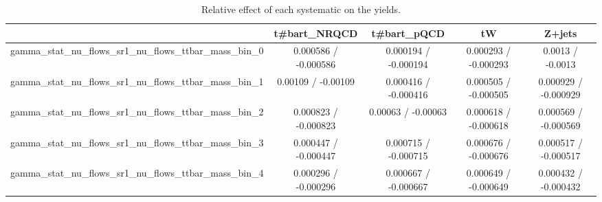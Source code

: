 \documentclass[10pt]{article}
\begin{document}
\begin{table}[htbp]
\begin{center}
\begin{tabular}{|c|c|c|c|c|}
\hline 
      & t#bar{t}_{NRQCD}      & t#bar{t}_{pQCD}      & tW      & Z+jets \\ 
\hline 
  gamma_stat_nu_flows_sr1_nu_flows_ttbar_mass_bin_0 & 0.000586 / -0.000586 & 0.000194 / -0.000194 & 0.000293 / -0.000293 & 0.0013 / -0.0013 \\ 
  gamma_stat_nu_flows_sr1_nu_flows_ttbar_mass_bin_1 & 0.00109 / -0.00109 & 0.000416 / -0.000416 & 0.000505 / -0.000505 & 0.000929 / -0.000929 \\ 
  gamma_stat_nu_flows_sr1_nu_flows_ttbar_mass_bin_2 & 0.000823 / -0.000823 & 0.00063 / -0.00063 & 0.000618 / -0.000618 & 0.000569 / -0.000569 \\ 
  gamma_stat_nu_flows_sr1_nu_flows_ttbar_mass_bin_3 & 0.000447 / -0.000447 & 0.000715 / -0.000715 & 0.000676 / -0.000676 & 0.000517 / -0.000517 \\ 
  gamma_stat_nu_flows_sr1_nu_flows_ttbar_mass_bin_4 & 0.000296 / -0.000296 & 0.000667 / -0.000667 & 0.000649 / -0.000649 & 0.000432 / -0.000432 \\ 
\hline 
\end{tabular} 
\caption{Relative effect of each systematic on the yields.} 
\end{center} 
\end{table} 
\end{document}

